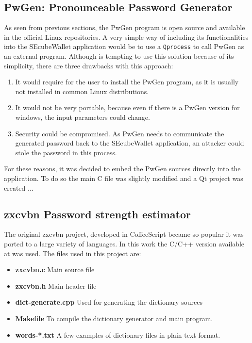 \subsection{PwGen: Pronounceable Password Generator}
As seen from previous sections, the PwGen program is open source and available in the official Linux repositories. A very simple way of including its functionalities into the SEcubeWallet application would be to use a \texttt{Qprocess} to call PwGen as an external program. Although is tempting to use this solution because of its simplicity, there are three drawbacks with this approach:

\begin{enumerate}
\item It would require for the user to install the PwGen program, as it is usually not installed in common Linux distributions.
\item It would not be very portable, because even if there is a PwGen version for windows, the input parameters could change.
\item Security could be compromised. As PwGen needs to communicate the generated password back to the SEcubeWallet application, an attacker could stole the password in this process.
\end{enumerate}

For these reasons, it was decided to embed the PwGen sources directly into the application. To do so the main C file was slightly modified and a Qt project was created ...

\subsection{zxcvbn Password strength estimator}

The original zxcvbn project, developed in CoffeeScript became so popular it was ported to a large variety of languages. In this work the C/C++ version available at \cite{zxgit} was used. The files used in this project are:

\begin{itemize}
\setlength\itemsep{0pt}
\item \textbf{zxcvbn.c} Main source file
\item \textbf{zxcvbn.h} Main header file
\item \textbf{dict-generate.cpp} Used for generating the dictionary sources
\item \textbf{Makefile} To compile the dictionary generator and main program.
\item \textbf{words-*.txt} A few examples of dictionary files in plain text format.
\end{itemize}

